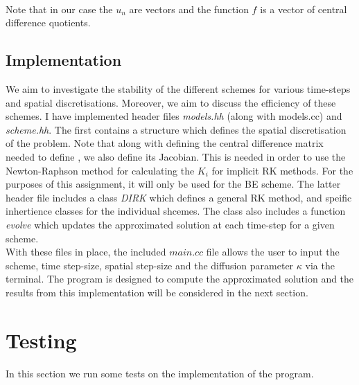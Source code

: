 \documentclass[10pt]{article}
\begin{document}
\noindent{}
\\

Note that in our case the $u_n$ are vectors and the function $f$ is a vector of central difference quotients.

\subsection{Implementation}

We aim to investigate the stability of the different schemes for various time-steps and spatial discretisations. Moreover, we aim to discuss the efficiency of these schemes. I have implemented header files \emph{models.hh} (along with models.cc) and \emph{scheme.hh}. The first contains a structure which defines the spatial discretisation of the problem. Note that along with defining the central difference matrix needed to define , we also define its Jacobian. This is needed in order to use the Newton-Raphson method for calculating the $K_i$ for implicit RK methods. For the purposes of this assignment, it will only be used for the BE scheme. The latter header file includes a class \textit{DIRK} which defines a general RK method, and speific inhertience classes for the individual shcemes. The class also includes a function \textit{evolve} which updates the approximated solution at each time-step for a given scheme.\\


With these files in place, the included $\textit{main.cc}$ file allows the user to input the scheme, time step-size, spatial step-size and the diffusion parameter $\kappa$ via the terminal. The program is designed to compute the approximated solution and the results from this implementation will be considered in the next section.

\section{Testing}
In this section we run some tests on the implementation of the program.
\end{document}
